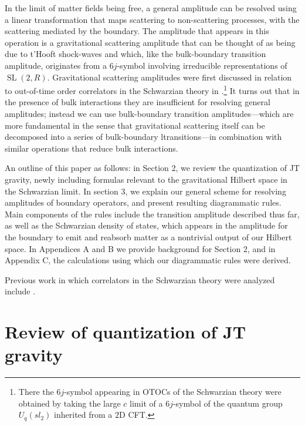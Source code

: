 \documentclass[12pt]{article}
\newcommand{\RR}{\mathbb{R}}
\DeclareMathOperator{\tSL}{\widetilde{\mathrm{SL}}}
\def\widetilde#1{#1}%
\def\RR{R}
\begin{document}
In the limit of matter fields being free, a general amplitude can be resolved using a linear transformation that maps scattering to non-scattering processes, with the scattering mediated by the boundary. The amplitude that appears in this operation is a gravitational scattering amplitude that can be thought of as being due to t'Hooft shock-waves and which, like the bulk-boundary transition amplitude, originates from a $6j$-symbol involving irreducible representations of $\tSL(2,\RR)$.  Gravitational scattering amplitudes were first discussed in relation to out-of-time order correlators in the Schwarzian theory in \cite{MeTuVe17, Lam18}.\footnote{There the $6j$-symbol appearing in OTOCs  of the Schwarzian theory were obtained by taking the large $c$ limit of a $6j$-symbol of the quantum group $U_q(sl_2)$ inherited from a $2$D CFT.} It turns out that in the presence of bulk interactions they are insufficient for resolving general amplitudes; instead we can use bulk-boundary transition amplitudes---which are more fundamental in the sense that gravitational scattering itself can be decomposed into a series of bulk-boundary ltransitions---in combination with similar operations that reduce bulk interactions.

An outline of this paper as follows: in Section 2, we review the quantization of JT gravity, newly including formulas relevant to the gravitational Hilbert space in the Schwarzian limit. In section 3, we explain our general scheme for resolving amplitudes of boundary operators, and present resulting diagrammatic rules. Main components of the rules include the transition amplitude described thus far, as well as the Schwarzian density of states, which appears in the amplitude for the boundary to emit and reabsorb matter as a nontrivial output of our Hilbert space. In Appendices A and B we provide background for Section 2, and in Appendix C, the calculations using which our diagrammatic rules were derived.


Previous work in which correlators in the Schwarzian theory were analyzed include \cite{MeTuVe17, Bl18, Ya19,Il19}.






\section{Review of quantization of JT gravity}
\end{document}

